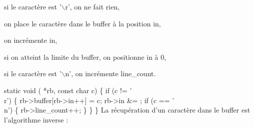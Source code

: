 \documentclass{scrartcl}%
\begin{document}
\begin{packed_itemize}
  \item si le caractère est '$\backslash$r', on ne fait rien,
  \item on place le caractère dans le buffer à la position {\Tt{}in\nwendquote},
  \item on incrémente {\Tt{}in\nwendquote},
  \item si on atteint la limite du buffer, on positionne {\Tt{}in\nwendquote} à 0,
  \item si le caractère est '$\backslash$n', on incrémente {\Tt{}line{\_}count\nwendquote}.
\end{packed_itemize}

\nwenddocs{}\endmoddef\nwstartdeflinemarkup{}\nwenddeflinemarkup
static  void ( *rb, const char c) \{
    if (c != '\\r') \{
        rb->buffer[rb->in++] = c;
        rb->in &= ;
        if (c == '\\n') \{
            rb->line_count++;
        \}
    \}
\}
\nwendcode{}\nwdocspar
La récupération d'un caractère dans le buffer est l'algorithme inverse :
\end{document}
